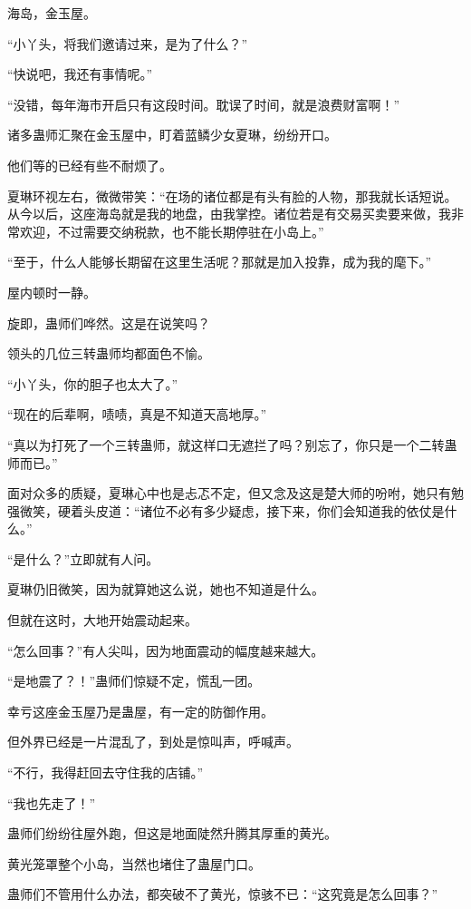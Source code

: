 
\begin{this_body}

海岛，金玉屋。

“小丫头，将我们邀请过来，是为了什么？”

“快说吧，我还有事情呢。”

“没错，每年海市开启只有这段时间。耽误了时间，就是浪费财富啊！”

诸多蛊师汇聚在金玉屋中，盯着蓝鳞少女夏琳，纷纷开口。

他们等的已经有些不耐烦了。

夏琳环视左右，微微带笑：“在场的诸位都是有头有脸的人物，那我就长话短说。从今以后，这座海岛就是我的地盘，由我掌控。诸位若是有交易买卖要来做，我非常欢迎，不过需要交纳税款，也不能长期停驻在小岛上。”

“至于，什么人能够长期留在这里生活呢？那就是加入投靠，成为我的麾下。”

屋内顿时一静。

旋即，蛊师们哗然。这是在说笑吗？

领头的几位三转蛊师均都面色不愉。

“小丫头，你的胆子也太大了。”

“现在的后辈啊，啧啧，真是不知道天高地厚。”

“真以为打死了一个三转蛊师，就这样口无遮拦了吗？别忘了，你只是一个二转蛊师而已。”

面对众多的质疑，夏琳心中也是忐忑不定，但又念及这是楚大师的吩咐，她只有勉强微笑，硬着头皮道：“诸位不必有多少疑虑，接下来，你们会知道我的依仗是什么。”

“是什么？”立即就有人问。

夏琳仍旧微笑，因为就算她这么说，她也不知道是什么。

但就在这时，大地开始震动起来。

“怎么回事？”有人尖叫，因为地面震动的幅度越来越大。

“是地震了？！”蛊师们惊疑不定，慌乱一团。

幸亏这座金玉屋乃是蛊屋，有一定的防御作用。

但外界已经是一片混乱了，到处是惊叫声，呼喊声。

“不行，我得赶回去守住我的店铺。”

“我也先走了！”

蛊师们纷纷往屋外跑，但这是地面陡然升腾其厚重的黄光。

黄光笼罩整个小岛，当然也堵住了蛊屋门口。

蛊师们不管用什么办法，都突破不了黄光，惊骇不已：“这究竟是怎么回事？”


\end{this_body}
